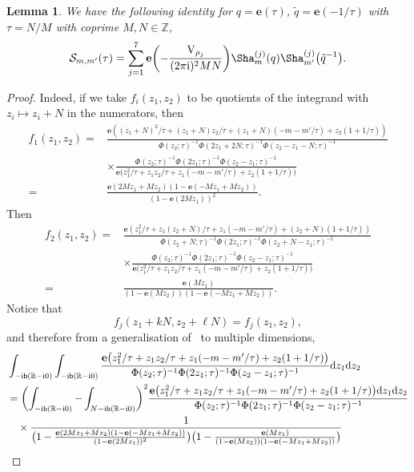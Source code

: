 \documentclass[pdftex]{sigma}
\numberwithin{equation}{section}
\newtheorem{Lemma}[Theorem]{Lemma}
\def\BZ{\mathbb{Z}}
\def\BR{\mathbb{R}}
\def\tq{\tilde{q}}
\def\be{\begin{equation}}
\def\ee{\end{equation}}
\def\e{\mathbf e}
\def\VC{\mathrm{VC}}
\def\WRT{\Sha}
\def\BZ{\mathbb Z}
\def\BR{\mathbb R}
\def\calS{\mathcal S}
\def\tq{\tilde{q}}
\def\be{\begin{equation}}
\def\ee{\end{equation}}
\def\VC{\mathrm{V}}
\begin{document}
\begin{Lemma}
 We have the following identity for $q=\e(\tau)$, $\tq=\e(-1/\tau)$ with $\tau=N/M$ with coprime $M,N\in\BZ$,
 \be\label{eq:lem.bilin.Q}
 \calS_{m,m'}(\tau)
  =
 \sum_{j=1}^7\e\biggl(-\frac{\VC_{\rho_j}}{(2\pi {\rm i})^2MN}\biggr)\WRT^{(j)}_{m}(q)\WRT^{(j)}_{m'}\bigl(\tq^{-1}\bigr) .
 \ee
\end{Lemma}
\begin{proof}
Indeed, if we take $f_i(z_1,z_2)$ to be quotients of the integrand with $z_{i}\mapsto z_i+N$ in the numerators, then
\begin{align*}
 f_{1}(z_{1},z_{2})
 ={}&
 \frac{\e((z_1+N)^2/\tau+(z_1+N)z_2/\tau+(z_1+N)(-m-m'/\tau)+z_2(1+1/\tau))}{\Phi(z_2;\tau)^{-1}\Phi(2z_1+2N;\tau)^{-1}\Phi(z_2-z_1-N;\tau)^{-1}}\\
 & \times\frac{\Phi(z_2;\tau)^{-1}\Phi(2z_1;\tau)^{-1}\Phi(z_2-z_1;\tau)^{-1}}{\e\bigl(z_1^2/\tau+z_1z_2/\tau+z_1(-m-m'/\tau)+z_2(1+1/\tau)\bigr)}\\
={} &
 \frac{\e(2Mz_{1}+Mz_{2})(1-\e(-Mz_1+Mz_2))}{(1-\e(2Mz_1))^2}.
\end{align*}
Then
\begin{align*}
 f_{2}(z_{1},z_{2})
 ={}&
 \frac{\e(z_1^2/\tau+z_1(z_2+N)/\tau+z_1(-m-m'/\tau)+(z_2+N)(1+1/\tau))}{\Phi(z_2+N;\tau)^{-1}\Phi(2z_1;\tau)^{-1}\Phi(z_2+N-z_1;\tau)^{-1}}\\
 & \times\frac{\Phi(z_2;\tau)^{-1}\Phi(2z_1;\tau)^{-1}\Phi(z_2-z_1;\tau)^{-1}}{\e\bigl(z_1^2/\tau+z_1z_2/\tau+z_1(-m-m'/\tau)+z_2(1+1/\tau)\bigr)}\\
={} &
 \frac{\e(Mz_{1})}{(1-\e(Mz_2))(1-\e(-Mz_1+Mz_2))} .
\end{align*}
Notice that
\[
 f_{j}(z_1+kN,z_2+\ell N)
  =
 f_{j}(z_1,z_2) ,
\]
and therefore from a generalisation of~\cite[Lemma~2.1]{GK:rat} to multiple dimensions,
\begin{align}
 &\int_{-{\rm i}\mathsf{b}(\BR-{\rm i}0)}\int_{-{\rm i}\mathsf{b}(\BR-{\rm i}0)}\frac{\e\bigl(z_1^2/\tau+z_1z_2/\tau+z_1(-m-m'/\tau) +z_2(1+1/\tau)\bigr)}{\Phi(z_2;\tau)^{-1}\Phi(2z_1;\tau)^{-1}\Phi(z_2-z_1;\tau)^{-1}}{\rm d}z_1{\rm d}z_2\nonumber\\
 & =\biggl(\int_{-{\rm i}\mathsf{b}(\BR-{\rm i}0)}-\int_{N-{\rm i}\mathsf{b}(\BR-{\rm i}0)}\biggr)^2\frac{\e\bigl(z_1^2/\tau+z_1z_2/\tau +z_1(-m-m'/\tau)+z_2(1+1/\tau)\bigr){\rm d} z_1{\rm d} z_2}{\Phi(z_2;\tau)^{-1}\Phi(2z_1;\tau)^{-1}\Phi(z_2-z_1;\tau)^{-1} }\nonumber\\
 & \quad \times\frac{1}{\bigl(1-\frac{\e(2Mz_{1}+Mz_{2})(1-\e(-Mz_1+Mz_2))}{(1-\e(2Mz_1))^2}\bigr)\bigl(1-\frac{\e(Mz_{1})}{(1-\e(Mz_2))(1-\e(-Mz_1+Mz_2))}\bigr)}\nonumber\\

\end{align}
\end{proof}
\end{document}
